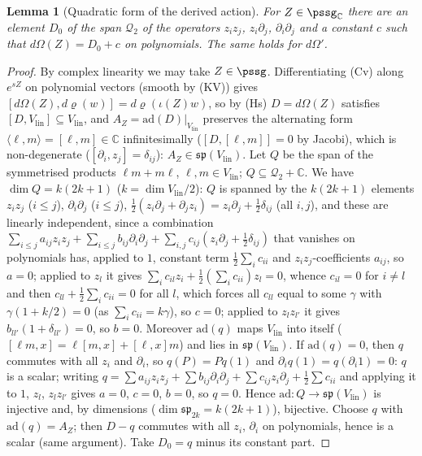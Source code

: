 \documentclass[10pt]{amsart}
\newtheorem{lemma}[theorem]{Lemma}
\theoremstyle{definition}
\theoremstyle{remark}
\newcommand{\C}{\mathbb C}
\begin{document}
\begin{lemma}[Quadratic form of the derived action]\label{pss:weyl}
For $Z\in\pssg_\C$ there are an element $D_0$ of the span $\mathcal Q_2$ of the operators $z_iz_j$,
$z_i\partial_j$, $\partial_i\partial_j$ and a constant $c$ such that $d\Omega(Z)=D_0+c$ on polynomials.
The same holds for $d\Omega'$.
\end{lemma}
\begin{proof}
By complex linearity we may take $Z\in\pssg$. Differentiating (Cv) along $e^{sZ}$ on polynomial vectors
(smooth by (KV)) gives $[d\Omega(Z),d\varrho(w)]=d\varrho(\iota(Z)w)$, so by (Hs) $D=d\Omega(Z)$ satisfies
$[D,V_{\mathrm{lin}}]\subseteq V_{\mathrm{lin}}$, and $A_Z=\mathrm{ad}(D)|_{V_{\mathrm{lin}}}$ preserves the
alternating form $\langle\ell,m\rangle=[\ell,m]\in\C$ infinitesimally ($[D,[\ell,m]]=0$ by Jacobi), which is
non-degenerate ($[\partial_i,z_j]=\delta_{ij}$): $A_Z\in\mathfrak{sp}(V_{\mathrm{lin}})$. Let $Q$ be the span of
the symmetrised products $\ell m+m\ell$, $\ell,m\in V_{\mathrm{lin}}$; $Q\subseteq\mathcal Q_2+\C$. We have $\dim Q=k(2k+1)$
($k=\dim V_{\mathrm{lin}}/2$): $Q$ is spanned by the $k(2k+1)$ elements $z_iz_j$ ($i\le j$), $\partial_i\partial_j$
($i\le j$), $\frac12(z_i\partial_j+\partial_jz_i)=z_i\partial_j+\frac12\delta_{ij}$ (all $i,j$), and these are
linearly independent, since a combination $\sum_{i\le j}a_{ij}z_iz_j+\sum_{i\le j}b_{ij}\partial_i\partial_j+
\sum_{i,j}c_{ij}(z_i\partial_j+\frac12\delta_{ij})$ that vanishes on polynomials has, applied to $1$, constant
term $\frac12\sum_ic_{ii}$ and $z_iz_j$-coefficients $a_{ij}$, so $a=0$; applied to $z_l$ it gives
$\sum_ic_{il}z_i+\frac12(\sum_ic_{ii})z_l=0$, whence $c_{il}=0$ for $i\ne l$ and then $c_{ll}+\frac12\sum_ic_{ii}=0$
for all $l$, which forces all $c_{ll}$ equal to some $\gamma$ with $\gamma(1+k/2)=0$ (as $\sum_ic_{ii}=k\gamma$), so $c=0$; applied to
$z_lz_{l'}$ it gives $b_{ll'}(1+\delta_{ll'})=0$, so $b=0$. Moreover $\mathrm{ad}(q)$ maps $V_{\mathrm{lin}}$ into itself
($[\ell m,x]=\ell[m,x]+[\ell,x]m$) and lies in $\mathfrak{sp}(V_{\mathrm{lin}})$. If $\mathrm{ad}(q)=0$, then $q$
commutes with all $z_i$ and $\partial_i$, so $q(P)=Pq(1)$ and $\partial_iq(1)=q(\partial_i1)=0$: $q$ is a scalar;
writing $q=\sum a_{ij}z_iz_j+\sum b_{ij}\partial_i\partial_j+\sum c_{ij}z_i\partial_j+\frac12\sum c_{ii}$ and
applying it to $1$, $z_l$, $z_lz_{l'}$ gives $a=0$, $c=0$, $b=0$, so $q=0$. Hence $\mathrm{ad}\colon Q\to
\mathfrak{sp}(V_{\mathrm{lin}})$ is injective and, by dimensions ($\dim\mathfrak{sp}_{2k}=k(2k+1)$), bijective.
Choose $q$ with $\mathrm{ad}(q)=A_Z$; then $D-q$ commutes with all $z_i$, $\partial_i$ on polynomials,
hence is a scalar (same argument). Take $D_0=q$ minus its constant part.
\end{proof}
\end{document}
